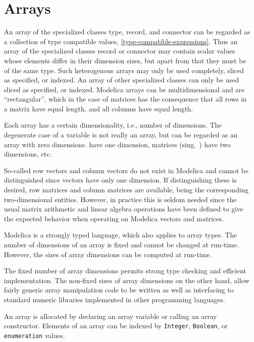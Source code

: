 \chapter{Arrays}\label{arrays}

An array of the specialized classes type, record, and connector can be regarded as a collection of type compatible values, \cref{type-compatible-expressions}.
Thus an array of the specialized classes record or connector may contain scalar values whose elements differ in their dimension sizes, but apart from that they must be of the same type.
Such heterogenous arrays may only be used completely, sliced as specified, or indexed.
An array of other specialized classes can only be used sliced as specified, or indexed.
Modelica arrays can be multidimensional and are ``rectangular'', which in the case of matrices has the consequence that all rows in a matrix have equal length, and all columns have equal length.

Each array has a certain dimensionality, i.e., number of dimensions.
The degenerate case of a  variable is not really an array, but can be regarded as an array with zero dimensions.
 have one dimension, matrices (sing.\ ) have two dimensions, etc.

So-called row vectors and column vectors do not exist in Modelica and cannot be distinguished since vectors have only one dimension.
If distinguishing these is desired, row matrices and column matrices are available, being the corresponding two-dimensional entities.
However, in practice this is seldom needed since the usual matrix arithmetic and linear algebra operations have been defined to give the expected behavior when operating on Modelica vectors and matrices.

Modelica is a strongly typed language, which also applies to array
types. The number of dimensions of an array is fixed and cannot be
changed at run-time. However, the sizes of array dimensions can
be computed at run-time.

The fixed number of array dimensions permits strong type checking and efficient implementation.  The non-fixed sizes of array
dimensions on the other hand, allow fairly generic array manipulation code to be written as well as interfacing to standard
numeric libraries implemented in other programming languages.

An array is allocated by declaring an array variable or calling an array
constructor. Elements of an array can be indexed by \lstinline!Integer!, \lstinline!Boolean!, or
\lstinline!enumeration! values.

